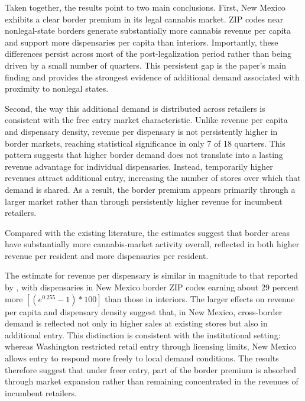 \documentclass[12pt]{article}
\begin{document}
Taken together, the results point to two main conclusions. First, New Mexico exhibits a clear border premium in its legal cannabis market. ZIP codes near nonlegal-state borders generate substantially more cannabis revenue per capita and support more dispensaries per capita than interiors. Importantly, these differences persist across most of the post-legalization period rather than being driven by a small number of quarters. This persistent gap is the paper’s main finding and provides the strongest evidence of additional demand associated with proximity to nonlegal states.

Second, the way this additional demand is distributed across retailers is consistent with the free entry market characteristic. Unlike revenue per capita and dispensary density, revenue per dispensary is not persistently higher in border markets, reaching statistical significance in only 7 of 18 quarters. This pattern suggests that higher border demand does not translate into a lasting revenue advantage for individual dispensaries. Instead, temporarily higher revenues attract additional entry, increasing the number of stores over which that demand is shared. As a result, the border premium appears primarily through a larger market rather than through persistently higher revenue for incumbent retailers. 

Compared with the existing literature, the estimates suggest that border areas have substantially more cannabis-market activity overall, reflected in both higher revenue per resident and more dispensaries per resident.

The estimate for revenue per dispensary is similar in magnitude to that reported by \cite{HansenMillerWeber2020}, with dispensaries in New Mexico border ZIP codes earning about 29 percent more $\left[(e^{0.255}-1)*100\right]$ than those in interiors.
The larger effects on revenue per capita and dispensary density suggest that, in New Mexico, cross-border demand is reflected not only in higher sales at existing stores but also in additional entry. This distinction is consistent with the institutional setting: whereas Washington restricted retail entry through licensing limits, New Mexico allows entry to respond more freely to local demand conditions. The results therefore suggest that under freer entry, part of the border premium is absorbed through market expansion rather than remaining concentrated in the revenues of incumbent retailers.


\end{document}
